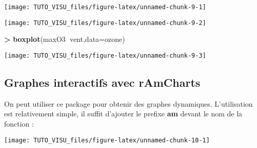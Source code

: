 \documentclass[]{book}
\newenvironment{Shaded}{\begin{snugshade}}{\end{snugshade}}
\newcommand{\DataTypeTok}[1]{\textcolor[rgb]{0.13,0.29,0.53}{#1}}
\newcommand{\KeywordTok}[1]{\textcolor[rgb]{0.13,0.29,0.53}{\textbf{#1}}}
\newcommand{\NormalTok}[1]{#1}
\newcommand{\OperatorTok}[1]{\textcolor[rgb]{0.81,0.36,0.00}{\textbf{#1}}}
\newcommand{\StringTok}[1]{\textcolor[rgb]{0.31,0.60,0.02}{#1}}
\theoremstyle{definition}
\theoremstyle{definition}
\theoremstyle{definition}
\theoremstyle{remark}
\begin{document}
\begin{center}\texttt{[image: TUTO\_VISU\_files/figure-latex/unnamed-chunk-9-1]} \end{center}

\begin{Shaded}
\end{Shaded}

\begin{center}\texttt{[image: TUTO\_VISU\_files/figure-latex/unnamed-chunk-9-2]} \end{center}

\begin{Shaded}
\begin{Highlighting}[]
\OperatorTok{>}\StringTok{ }\KeywordTok{boxplot}\NormalTok{(maxO3}\OperatorTok{~}\NormalTok{vent,}\DataTypeTok{data=}\NormalTok{ozone)}
\end{Highlighting}
\end{Shaded}

\begin{center}\texttt{[image: TUTO\_VISU\_files/figure-latex/unnamed-chunk-9-3]} \end{center}

\hypertarget{graphes-interactifs-avec-ramcharts}{%
\subsection{Graphes interactifs avec rAmCharts}\label{graphes-interactifs-avec-ramcharts}}

On peut utiliser ce package pour obtenir des graphes dynamiques. L'utilisation est relativement simple, il suffit d'ajouter le prefixe \textbf{am} devant le nom de la fonction :

\begin{Shaded}
\end{Shaded}

\begin{center}\texttt{[image: TUTO\_VISU\_files/figure-latex/unnamed-chunk-10-1]} \end{center}
\end{document}
